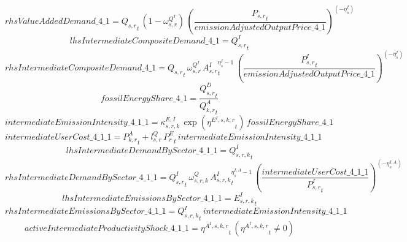 \begin{dmath*}
rhsValueAddedDemand\_4\_1 = {{Q_{s,r}}}_{t}\, \left(1-{{\omega^{Q^{I}}_{s,r}}}\right)\, \left(\frac{{{P_{s,r}}}_{t}}{{emissionAdjustedOutputPrice\_4\_1}}\right)^{\left(-{{\eta^{I}_{s}}}\right)}
\end{dmath*}
\begin{dmath*}
lhsIntermediateCompositeDemand\_4\_1 = {{Q^{I}_{s,r}}}_{t}
\end{dmath*}
\begin{dmath*}
rhsIntermediateCompositeDemand\_4\_1 = {{Q_{s,r}}}_{t}\, {{\omega^{Q^{I}}_{s,r}}}\, {{A^{I}_{s,r}}}_{t}^{{{\eta^{I}_{s}}}-1}\, \left(\frac{{{P^{I}_{s,r}}}_{t}}{{emissionAdjustedOutputPrice\_4\_1}}\right)^{\left(-{{\eta^{I}_{s}}}\right)}
\end{dmath*}
\begin{dmath*}
fossilEnergyShare\_4\_1 = \frac{{{Q^{D}_{s,r}}}_{t}}{{{Q^{A}_{k,r}}}_{t}}
\end{dmath*}
\begin{dmath*}
intermediateEmissionIntensity\_4\_1\_1 = {{\kappa^{E,I}_{s,r,k}}}\, \exp\left({{\eta^{E^{I},s,k,r}}}_{t}\right)\, {fossilEnergyShare\_4\_1}
\end{dmath*}
\begin{dmath*}
intermediateUserCost\_4\_1\_1 = {{P^{A}_{k,r}}}_{t}+{{l^{Q}_{s,r}}}\, {{P^E_r}}_{t}\, {intermediateEmissionIntensity\_4\_1\_1}
\end{dmath*}
\begin{dmath*}
lhsIntermediateDemandBySector\_4\_1\_1 = {{Q^{I}_{s,r,k}}}_{t}
\end{dmath*}
\begin{dmath*}
rhsIntermediateDemandBySector\_4\_1\_1 = {{Q^{I}_{s,r}}}_{t}\, {{\omega^{Q}_{s,r,k}}}\, {{A^{I}_{s,r,k}}}_{t}^{{{\eta^{I,A}_{s}}}-1}\, \left(\frac{{intermediateUserCost\_4\_1\_1}}{{{P^{I}_{s,r}}}_{t}}\right)^{\left(-{{\eta^{I,A}_{s}}}\right)}
\end{dmath*}
\begin{dmath*}
lhsIntermediateEmissionsBySector\_4\_1\_1 = {{E^I_{s,r,k}}}_{t}
\end{dmath*}
\begin{dmath*}
rhsIntermediateEmissionsBySector\_4\_1\_1 = {{Q^{I}_{s,r,k}}}_{t}\, {intermediateEmissionIntensity\_4\_1\_1}
\end{dmath*}
\begin{dmath*}
activeIntermediateProductivityShock\_4\_1\_1 = {{\eta^{A^{I},s,k,r}}}_{t}\, \left({{\eta^{A^{I},s,k,r}}}_{t}\neq 0\right)
\end{dmath*}
